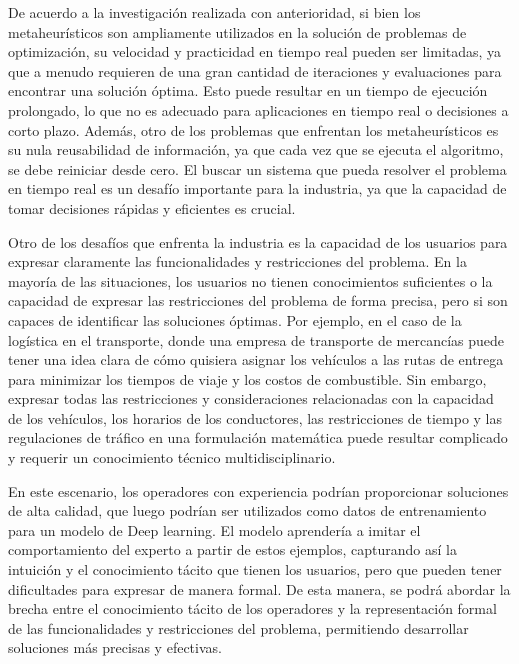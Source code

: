De acuerdo a la investigación realizada con anterioridad, si bien los
metaheurísticos son ampliamente utilizados en la solución de problemas de
optimización, su velocidad y practicidad en tiempo real pueden ser
limitadas, ya que a menudo requieren de una gran cantidad de iteraciones y
evaluaciones para encontrar una solución óptima. Esto puede resultar en un
tiempo de ejecución prolongado, lo que no es adecuado para aplicaciones en
tiempo real o decisiones a corto plazo. Además, otro de los problemas que
enfrentan los metaheurísticos es su nula reusabilidad de información, ya que
cada vez que se ejecuta el algoritmo, se debe reiniciar desde cero. El buscar
un sistema que pueda resolver el problema en tiempo real es un desafío
importante para la industria, ya que la capacidad de tomar decisiones rápidas y
eficientes es crucial.\medskip

Otro de los desafíos que enfrenta la industria es la capacidad de los usuarios
para expresar claramente las funcionalidades y restricciones del problema. En
la mayoría de las situaciones, los usuarios no tienen conocimientos suficientes
o la capacidad de expresar las restricciones del problema de forma precisa,
pero si son capaces de identificar las soluciones óptimas. Por ejemplo, en el
caso de la logística en el transporte, donde una empresa de transporte de
mercancías puede tener una idea clara de cómo quisiera asignar los vehículos a
las rutas de entrega para minimizar los tiempos de viaje y los costos de
combustible. Sin embargo, expresar todas las restricciones y consideraciones
relacionadas con la capacidad de los vehículos, los horarios de los
conductores, las restricciones de tiempo y las regulaciones de tráfico en una
formulación matemática puede resultar complicado y requerir un conocimiento
técnico multidisciplinario.\medskip

En este escenario, los operadores con experiencia podrían proporcionar
soluciones de alta calidad, que luego podrían ser utilizados como datos de
entrenamiento para un modelo de Deep learning. El modelo aprendería a imitar el
comportamiento del experto a partir de estos ejemplos, capturando así la
intuición y el conocimiento tácito que tienen los usuarios, pero que pueden
tener dificultades para expresar de manera formal. De esta manera, se podrá
abordar la brecha entre el conocimiento tácito de los operadores y la
representación formal de las funcionalidades y restricciones del problema,
permitiendo desarrollar soluciones más precisas y efectivas.\medskip

